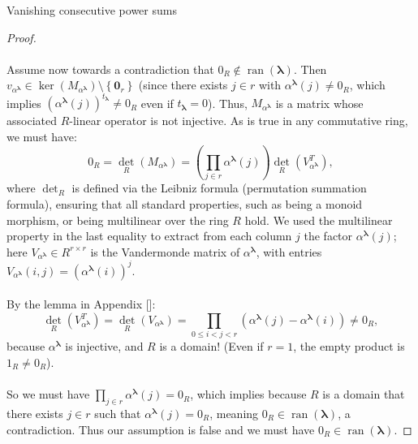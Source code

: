 \begin{appendixitem}{Vanishing consecutive power sums}
\begin{proof}
        \\\\
        Assume now towards a contradiction that \( 0_{R} \notin \operatorname{ran}\left(\boldsymbol{\lambda}\right) \). Then \( v_{\alpha^{\boldsymbol{\lambda}}} \in \operatorname{ker}\left(M_{\alpha^{\boldsymbol{\lambda}}}\right) \setminus \left\{\mathbf{0}_{r}\right\} \) (since there exists \( j \in r \) with \( \alpha^{\boldsymbol{\lambda}}\left(j\right) \neq 0_{R} \), which implies \( \left(\alpha^{\boldsymbol{\lambda}}\left(j\right)\right)^{t_{\boldsymbol{\lambda}}} \neq 0_{R} \) even if \( t_{\boldsymbol{\lambda}}=0 \)). Thus, \( M_{\alpha^{\boldsymbol{\lambda}}} \) is a matrix whose associated \( R \)-linear operator is not injective. As is true in any commutative ring, we must have:
        \[
            0_{R} = \operatorname{det}_{R}\left(M_{\alpha^{\boldsymbol{\lambda}}}\right) = \left( \prod_{j \in r} \alpha^{\boldsymbol{\lambda}}\left(j\right) \right) \operatorname{det}_{R}\left(V_{\alpha^{\boldsymbol{\lambda}}}^T\right),
        \]
        where \( \operatorname{det}_R \) is defined via the Leibniz formula (permutation summation formula), ensuring that all standard properties, such as being a monoid morphism, or being multilinear over the ring \( R \) hold. We used the multilinear property in the last equality to extract from each column \( j \) the factor \( \alpha^{\boldsymbol{\lambda}}\left(j\right) \); here \( V_{\alpha^{\boldsymbol{\lambda}}} \in R^{r \times r} \) is the Vandermonde matrix of \( \alpha^{\boldsymbol{\lambda}} \), with entries \( V_{\alpha^{\boldsymbol{\lambda}}}\left(i,j\right) = \left(\alpha^{\boldsymbol{\lambda}}\left(i\right)\right)^j \).
        \\\\
        By the lemma in Appendix []:
        \[
            \operatorname{det}_{R}\left(V_{\alpha^{\boldsymbol{\lambda}}}^T\right) = \operatorname{det}_{R}\left(V_{\alpha^{\boldsymbol{\lambda}}}\right) = \prod_{0 \leq i < j < r} \left(\alpha^{\boldsymbol{\lambda}}\left(j\right) - \alpha^{\boldsymbol{\lambda}}\left(i\right)\right) \neq 0_{R},
        \]
        because \( \alpha^{\boldsymbol{\lambda}} \) is injective, and \( R \) is a domain! (Even if \( r=1 \), the empty product is \( 1_{R} \neq 0_{R} \)).
        \\\\
        So we must have \( \prod_{j \in r} \alpha^{\boldsymbol{\lambda}}\left(j\right) = 0_{R} \), which implies because \( R \) is a domain that there exists \( j \in r \) such that \( \alpha^{\boldsymbol{\lambda}}\left(j\right) = 0_{R} \), meaning \( 0_{R} \in \operatorname{ran}\left(\boldsymbol{\lambda}\right) \), a contradiction. Thus our assumption is false and we must have \( 0_{R} \in \operatorname{ran}\left(\boldsymbol{\lambda}\right) \).

\end{proof}
\end{appendixitem}
